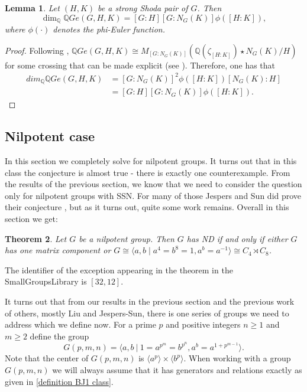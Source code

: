 \documentclass[a4paper,10pt]{amsart}
\newtheorem{lemma}{Lemma}[section]
\newtheorem{theorem}[lemma]{Theorem}
\theoremstyle{definition}
\theoremstyle{remark}
\newcommand{\Q}{{\mathbb Q}}
\begin{document}
\begin{lemma}\label{dim of simple of SSP}
Let $(H,K)$ be a strong Shoda pair of $G$. Then
$$\dim_{\Q} \Q G e(G,H,K) =  [G:H] [G:N_G(K)] \phi([H:K]),$$
where $\phi(\cdot)$ denotes the phi-Euler function.
\end{lemma}
\begin{proof}
Following \cite[Theorem 3.5.5]{GRG1}, $\Q G e(G,H,K) \cong M_{[G : N_G(K)]}(\Q(\zeta_{[H:K]}) \star N_G(K)/H)$ for some crossing that can be made explicit (see \cite[Remark 3.5.6]{GRG1}). Therefore, one has that
$$\begin{array}{ll}
dim_{\Q} \Q G e(G,H,K) & = [G : N_G(K)] ^2 \phi([H:K]) [N_G(K) : H] \\
& = [G:H] [G:N_G(K)] \phi([H:K]).
\end{array}$$
\end{proof}

\subsection{Nilpotent case}\label{sec:NDForNilpotent}

In this section we completely solve  for nilpotent groups. It turns out that in this class the conjecture is almost true - there is exactly one counterexample. From the results of the previous section, we know that we need to consider the question only for nilpotent groups with SSN. For many of those Jespers and Sun did prove their conjecture \cite[Corollary 4.12]{JespersSun}, but as it turns out, quite some work remains. Overall in this section we get:

\begin{theorem}\label{th:NilpotentCase}
Let $G$ be a nilpotent group. Then $G$ has ND if and only if either $G$ has one matrix component or $G \cong \langle a,b \mid a^4=b^8 =1, a^b =a^{-1} \rangle \cong C_4 \rtimes C_8$. 
\end{theorem}

The identifier of the exception appearing in the theorem in the SmallGroupsLibrary \cite{SmallGroupLibrary} is $[32,12]$.


It turns out that from our results in the previous section and the previous work of others, mostly Liu and Jespers-Sun, there is one series of groups we need to address which we define now. For a prime $p$ and positive integers $n \geq 1$ and $m \geq 2$ define the group
\begin{equation}\label{definition BJ1 class}
G(p,m,n) = \langle a,b \ | \ 1 = a^{p^m} = b^{p^n}, a^b = a^{1+p^{m-1}} \rangle. 
\end{equation}
Note that the center of $G(p,m,n)$ is $\langle a^p \rangle \times \langle b^p \rangle$. When working with a group $G(p,m,n)$ we will always assume that it has generators and relations exactly as given in \eqref{definition BJ1 class}.
\end{document}
